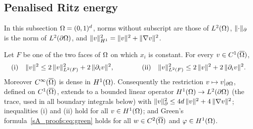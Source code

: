 \subsection{Penalised Ritz energy}\label{sA_proofs:sec:robin}

In this subsection $\Omega=(0,1)^d$, norms without subscript are those of $L^2(\Omega)$,
$\lVert \cdot\rVert_{\partial}$ is the norm of $L^2(\partial\Omega)$, and
$\lVert v\rVert_{H^1}^2=\lVert v\rVert^2+\lVert \nabla v\rVert^2$.

\begin{lemma}\label{sA_proofs:lem:trace}
Let $F$ be one of the two faces of $\Omega$ on which $x_i$ is constant. For every
$v\in C^1(\overline{\Omega})$,
\begin{equation}\label{sA_proofs:eq:trace}
\textup{(i)}\quad\lVert v\rVert^2\le2\,\lVert v\rVert_{L^2(F)}^2+2\,\lVert \partial_iv\rVert^2,
\qquad\qquad
\textup{(ii)}\quad\lVert v\rVert_{L^2(F)}^2\le2\,\lVert v\rVert^2+2\,\lVert \partial_iv\rVert^2 .
\end{equation}
Moreover $C^\infty(\overline{\Omega})$ is dense in $H^1(\Omega)$. Consequently the restriction
$v\mapsto v|_{\partial\Omega}$, defined on $C^1(\overline{\Omega})$, extends to a bounded linear operator
$H^1(\Omega)\to L^2(\partial\Omega)$ (the trace, used in all boundary integrals below) with
$\lVert v\rVert_{\partial}^2\le4d\,\lVert v\rVert^2+4\,\lVert \nabla v\rVert^2$; inequalities \textup{(i)}
and \textup{(ii)} hold for all $v\in H^1(\Omega)$; and Green's
formula~\eqref{sA_proofs:eq:green} holds for all $w\in C^2(\overline{\Omega})$ and
$\varphi\in H^1(\Omega)$.
\end{lemma}

